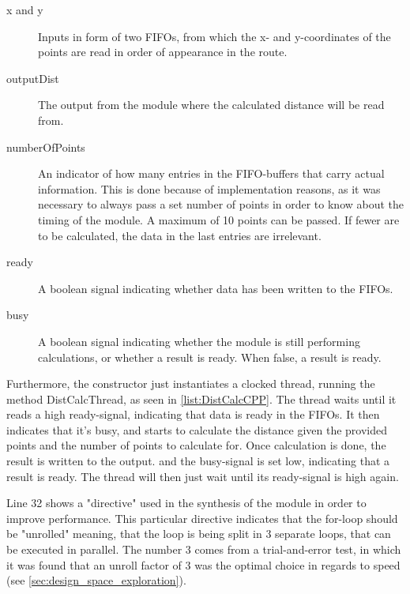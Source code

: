 \begin{description}
	\item[x and y] Inputs in form of two FIFOs, from which the x- and y-coordinates of the points are read in order of appearance in the route.
	\item[outputDist] The output from the module where the calculated distance will be read from.
	\item[numberOfPoints] An indicator of how many entries in the FIFO-buffers that carry actual information. This is done because of implementation reasons, as it was necessary to always pass a set number of points in order to know about the timing of the module. A maximum of 10 points can be passed. If fewer are to be calculated, the data in the last entries are irrelevant.	
	\item [ready] A boolean signal indicating whether data has been written to the FIFOs.
	\item [busy] A boolean signal indicating whether the module is still performing calculations, or whether a result is ready. When false, a result is ready.
\end{description}
Furthermore, the constructor just instantiates a clocked thread, running the method DistCalcThread, as seen in \cref{list:DistCalcCPP}. The thread waits until it reads a high ready-signal, indicating that data is ready in the FIFOs. It then indicates that it's busy, and starts to calculate the distance given the provided points and the number of points to calculate for. Once calculation is done, the result is written to the output. and the busy-signal is set low, indicating that a result is ready. The thread will then just wait until its ready-signal is high again.

Line 32 shows a "directive" used in the synthesis of the module in order to improve performance. This particular directive indicates that the for-loop should be "unrolled" meaning, that the loop is being split in 3 separate loops, that can be executed in parallel. The number 3 comes from a trial-and-error test, in which it was found that an unroll factor of 3 was the optimal choice in regards to speed (see \cref{sec:design_space_exploration}).





